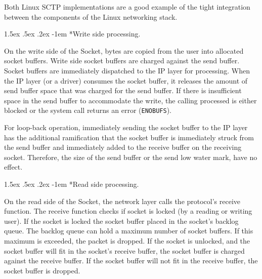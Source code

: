\documentclass[letterpaper,final,notitlepage,twocolumn,10pt,twoside]{article}
\makeatletter
\renewcommand\paragraph{\@startsection{paragraph}{4}{\z@}%
                                    {1.5ex \@plus .5ex \@minus .2ex}%
                                    {-1em}%
                                    {\normalfont\normalsize\bfseries\slshape}}
\makeatother
\begin{document}
Both Linux SCTP implementations are a good example of the tight integration
between the components of the Linux networking stack.

\paragraph*{Write side processing.}

On the write side of the Socket, bytes are copied from the user into allocated
socket buffers.  Write side socket buffers are charged against the send
buffer.  Socket buffers are immediately dispatched to the IP layer for
processing.  When the IP layer (or a driver) consumes the socket buffer, it
releases the amount of send buffer space that was charged for the send buffer.
If there is insufficient space in the send buffer to accommodate the write,
the calling processed is either blocked or the system call returns an error
(\texttt{ENOBUFS}).

For loop-back operation, immediately sending the socket buffer to the IP layer
has the additional ramification that the socket buffer is immediately struck
from the send buffer and immediately added to the receive buffer on the
receiving socket.  Therefore, the size of the send buffer or the send low
water mark, have no effect.




\paragraph*{Read side processing.}

On the read side of the Socket, the network layer calls the protocol's receive
function.  The receive function checks if socket is locked (by a reading or
writing user).  If the socket is locked the socket buffer placed in the
socket's backlog queue.  The backlog queue can hold a maximum number of socket
buffers.  If this maximum is exceeded, the packet is dropped.  If the socket
is unlocked, and the socket buffer will fit in the socket's receive buffer,
the socket buffer is charged against the receive buffer.  If the socket buffer
will not fit in the receive buffer, the socket buffer is dropped.
\end{document}

